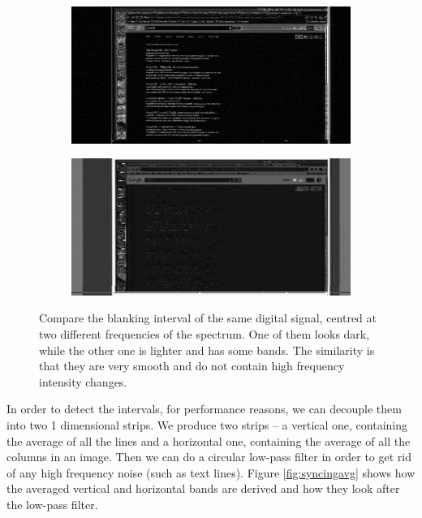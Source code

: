 \documentclass[a4paper,12pt,twoside,openright]{report}
\begin{document}
\begin{figure}[h]
\centering
\begin{subfigure}[b]{0.6\textwidth}
  \includegraphics[width=\textwidth]{sync_black}
\end{subfigure} \vspace{0.5cm}\vfill
\begin{subfigure}[b]{0.6\textwidth}
  \includegraphics[width=\textwidth]{sync_gray}
\end{subfigure}
\caption{Compare the blanking interval of the same digital signal, centred at two different frequencies of the spectrum. One of them looks dark, while the other one is lighter and has some bands. The similarity is that they are very smooth and do not contain high frequency intensity changes.}
\label{fig:syncing}
\end{figure}

In order to detect the intervals, for performance reasons, we can decouple them into two 1 dimensional strips. We produce two strips -- a vertical one, containing the average of all the lines and a horizontal one, containing the average of all the columns in an image. Then we can do a circular low-pass filter in order to get rid of any high frequency noise (such as text lines). Figure \ref{fig:syncingavg} shows how the averaged vertical and horizontal bands are derived and how they look after the low-pass filter.
\end{document}
